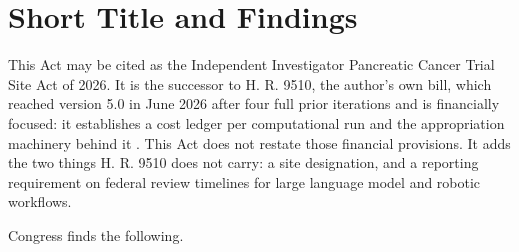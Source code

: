 
\section{Short Title and Findings}

This Act may be cited as the Independent Investigator Pancreatic Cancer Trial
Site Act of 2026. It is the successor to H. R. 9510, the author's own bill,
which reached version 5.0 in June 2026 after four full prior iterations and is
financially focused: it establishes a cost ledger per computational run and the
appropriation machinery behind it \cite{hr9510,vvuqbill}. This Act does not
restate those financial provisions. It adds the two things H. R. 9510 does not
carry: a site designation, and a reporting requirement on federal review
timelines for large language model and robotic workflows.

Congress finds the following.


